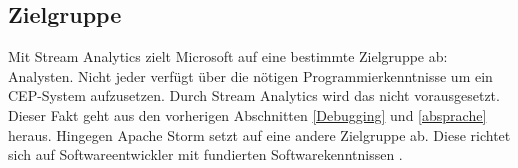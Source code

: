 \subsection{Zielgruppe}
Mit Stream Analytics zielt Microsoft auf eine bestimmte Zielgruppe ab: Analysten. Nicht jeder verfügt über die nötigen Programmierkenntnisse um ein CEP-System aufzusetzen. Durch Stream Analytics wird das nicht vorausgesetzt. Dieser Fakt geht aus den vorherigen Abschnitten \ref{Debugging} und \ref{absprache} heraus. Hingegen Apache Storm setzt auf eine andere Zielgruppe ab. Diese richtet sich auf Softwareentwickler mit fundierten Softwarekenntnissen \cite{Familiar.2017}. 

